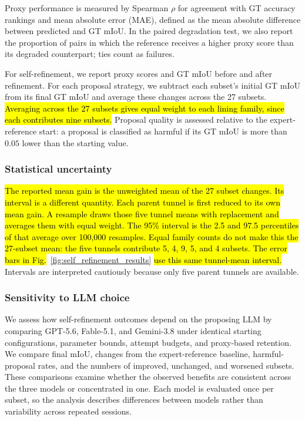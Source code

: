 \documentclass[a4paper,fleqn]{cas-dc}
\begin{document}
{Proxy performance is measured by Spearman $\rho$ for agreement with GT accuracy rankings and mean absolute error (MAE), defined as the mean absolute difference between predicted and GT mIoU. In the paired degradation test, we also report the proportion of pairs in which the reference receives a higher proxy score than its degraded counterpart; ties count as failures.

For self-refinement, we report proxy scores and GT mIoU before and after refinement. For each proposal strategy, we subtract each subset's initial GT mIoU from its final GT mIoU and average these changes across the 27 subsets. \hl{Averaging across the 27 subsets gives equal weight to each lining family, since each contributes nine subsets.} Proposal quality is assessed relative to the expert-reference start: a proposal is classified as harmful if its GT mIoU is more than $0.05$ lower than the starting value.


\subsubsection{Statistical uncertainty}
\label{sec:sensitivity}

\hl{The reported mean gain is the unweighted mean of the 27 subset changes. Its interval is a different quantity. Each parent tunnel is first reduced to its own mean gain. A resample draws those five tunnel means with replacement and averages them with equal weight. The 95\% interval is the 2.5 and 97.5 percentiles of that average over 100{,}000 resamples. Equal family counts do not make this the 27-subset mean: the five tunnels contribute 5, 4, 9, 5, and 4 subsets. The error bars in Fig.}~\ref{fig:self_refinement_results}\hl{ use this same tunnel-mean interval.} Intervals are interpreted cautiously because only five parent tunnels are available.

\subsubsection{Sensitivity to LLM choice}
\label{sec:llm-sensitivity}

We assess how self-refinement outcomes depend on the proposing LLM by comparing GPT-5.6, Fable-5.1, and Gemini-3.8 under identical starting configurations, parameter bounds, attempt budgets, and proxy-based retention. We compare final mIoU, changes from the expert-reference baseline, harmful-proposal rates, and the numbers of improved, unchanged, and worsened subsets. These comparisons examine whether the observed benefits are consistent across the three models or concentrated in one. Each model is evaluated once per subset, so the analysis describes differences between models rather than variability across repeated sessions.


}
\end{document}
